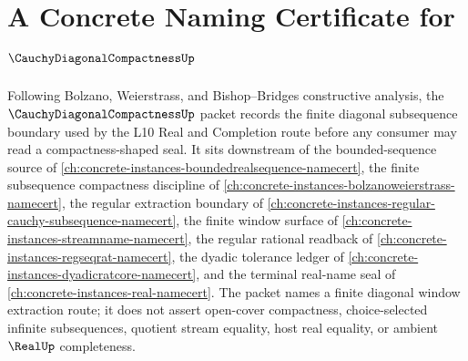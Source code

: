 \chapter{A Concrete Naming Certificate for $\CauchyDiagonalCompactnessUp$}
\label{ch:concrete-instances-cauchy-diagonal-compactness-namecert}

Following Bolzano, Weierstrass, and Bishop--Bridges constructive analysis, the $\CauchyDiagonalCompactnessUp$ packet records the finite diagonal subsequence boundary used by the L10 Real and Completion route before any consumer may read a compactness-shaped seal. It sits downstream of the bounded-sequence source of \autoref{ch:concrete-instances-boundedrealsequence-namecert}, the finite subsequence compactness discipline of \autoref{ch:concrete-instances-bolzanoweierstrass-namecert}, the regular extraction boundary of \autoref{ch:concrete-instances-regular-cauchy-subsequence-namecert}, the finite window surface of \autoref{ch:concrete-instances-streamname-namecert}, the regular rational readback of \autoref{ch:concrete-instances-regseqrat-namecert}, the dyadic tolerance ledger of \autoref{ch:concrete-instances-dyadicratcore-namecert}, and the terminal real-name seal of \autoref{ch:concrete-instances-real-namecert}. The packet names a finite diagonal window extraction route; it does not assert open-cover compactness, choice-selected infinite subsequences, quotient stream equality, host real equality, or ambient $\RealUp$ completeness.

